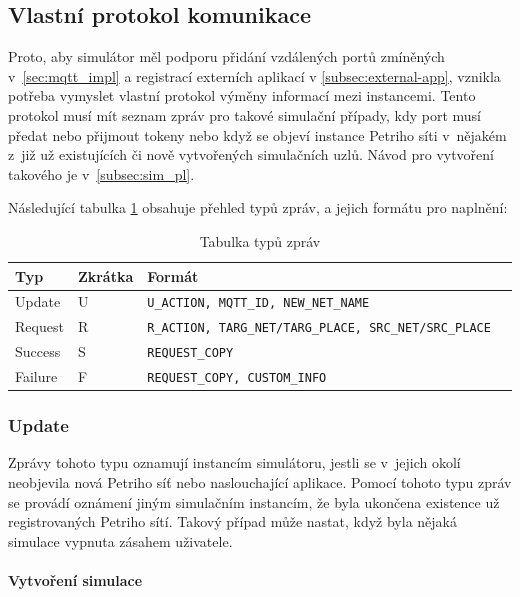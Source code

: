 \subsection{Vlastní protokol komunikace}
\label{subsec:comm-proto}

Proto, aby simulátor měl podporu přidání vzdálených portů zmíněných v~\ref{sec:mqtt_impl} a registrací externích aplikací v \ref{subsec:external-app}, vznikla potřeba vymyslet vlastní protokol výměny informací mezi instancemi. Tento protokol musí mít seznam zpráv pro takové simulační případy, kdy port musí předat nebo přijmout tokeny nebo když se objeví instance Petriho síti v~nějakém z~již už existujících či nově vytvořených simulačních uzlů. Návod pro vytvoření takového je v~\ref{subsec:sim_pl}.

Následující tabulka \ref{tab:mqtt-msg-types} obsahuje přehled typů zpráv, a jejich formátu pro naplnění:

\begin{table}[H]
  \vskip6pt
  \caption{Tabulka typů zpráv}
  \vskip6pt
  \centering
  \begin{tabular}{lllr}
    \toprule
    Typ & Zkrátka & Formát \\
    \midrule
    Update & U~& \texttt{U\_ACTION, MQTT\_ID, NEW\_NET\_NAME} \\
    Request & R & \texttt{R\_ACTION, TARG\_NET/TARG\_PLACE, SRC\_NET/SRC\_PLACE} \\
    Success & S~& \texttt{REQUEST\_COPY} \\
    Failure & F & \texttt{REQUEST\_COPY, CUSTOM\_INFO} \\
    \bottomrule
  \end{tabular}
  \label{tab:mqtt-msg-types}
\end{table}

\subsubsection{Update}

Zprávy tohoto typu oznamují instancím simulátoru, jestli se v~jejich okolí neobjevila nová Petriho síť nebo naslouchající aplikace. Pomocí tohoto typu zpráv se provádí oznámení jiným simulačním instancím, že byla ukončena existence už registrovaných Petriho sítí. Takový případ může nastat, když byla nějaká simulace vypnuta zásahem uživatele.

\paragraph{Vytvoření simulace}

